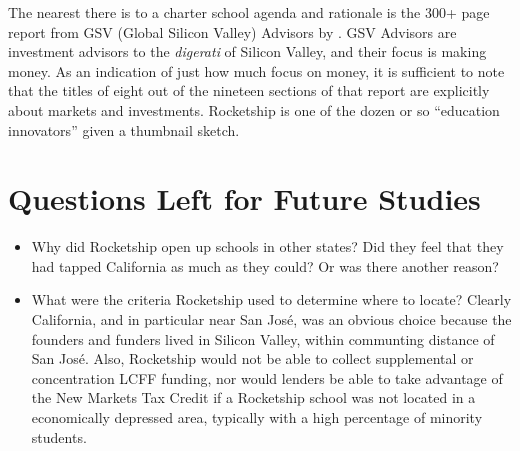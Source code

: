 The nearest there is to a charter school agenda and rationale is the 300+ page report from GSV (Global Silicon Valley) Advisors  by \citeauthor{Moe.etal2012}. GSV Advisors are investment advisors to the \emph{digerati} of Silicon Valley, and their focus is making money. As an indication of just how much  focus on money, it is sufficient to note that the titles of eight out of the nineteen sections of that report are explicitly about markets and investments. Rocketship is one of the dozen or so ``education innovators'' given a thumbnail sketch. %

\section{Questions Left for Future Studies}\label{sec:future-studies}
\begin{itemize}
  \item Why did Rocketship open up schools in other states? Did they feel that they had tapped California as much as they could? Or was there another reason?
  \item What were the criteria Rocketship used to determine where to locate? Clearly California, and in particular near San José, was an obvious choice because the founders and funders lived in Silicon Valley, within communting distance of San José. Also, Rocketship would not be able to collect supplemental or concentration LCFF funding, nor would lenders be able to take advantage of the New Markets Tax Credit if a Rocketship school was not located in a economically depressed area, typically with a high percentage of minority students.
\end{itemize}

\begin{comment}
\subsection{Validity}
  \subsection{Reliability}
  \subsection{Limitations}
  \section{Evaluating the Results}
  \section{Rival Explanations}
  \section{Future Research}
\end{comment}




